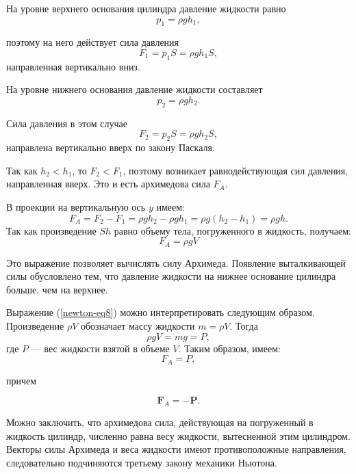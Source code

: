 \documentclass[14pt,a4paper,oneside]{extarticle}	%
\begin{document}
На уровне верхнего основания цилиндра давление жидкости равно $$ p_{1} = \rho gh_{1}, $$

поэтому на него действует сила давления $$ F_{1} = p_{1}S = \rho gh_{1}S, $$
направленная вертикально вниз.

На уровне нижнего основания давление жидкости составляет $$p_{2} = \rho gh_{2}.$$

Сила давления в этом случае $$ F_{2} = p_{2}S = \rho gh_{2}S, $$ 
направлена вертикально вверх по закону Паскаля.

Так как $ h_{2} < h_{1} $, то $ F_{2} < F_{1} $, поэтому возникает равнодействующая сил давления, направленная вверх. 
Это и есть архимедова сила $ F_{A} $. 

В проекции на вертикальную ось $ y $ имеем:
\begin{equation}\label{newton-eq7}
F_{A} = F_{2} - F_{1} = \rho gh_{2} - \rho gh_{1} = \rho g(h_{2} - h_{1}) = \rho gh.
\end{equation} 
Так как произведение $ Sh $ равно объему тела, погруженного в жидкость, получаем: 
\begin{equation}\label{newton-eq8}
F_{A} = \rho gV
\end{equation} 

Это выражение позволяет вычислять силу Архимеда.
Появление выталкивающей силы обусловлено тем, что давление жидкости на нижнее основание цилиндра больше, чем на верхнее.

Выражение (\ref{newton-eq8}) можно интерпретировать следующим образом. 
Произведение $ \rho V $ обозначает массу жидкости  $ m = \rho V $. 
Тогда $$\rho g V = mg = P,$$
где $ P $ — вес жидкости взятой в объеме $ V $. 
Таким образом, имеем:
\begin{equation}\label{newton-eq9}
F_{A} = P,
\end{equation} 

причем 

\begin{equation}\label{newton-eq10}
\textbf{F}_{A} = -\textbf{P}.
\end{equation} 

Можно заключить, что архимедова сила, действующая на погруженный в жидкость цилиндр, численно равна весу жидкости, вытесненной этим цилиндром.
Векторы силы Архимеда и веса жидкости имеют противоположные направления, следовательно подчиняются третьему закону механики Ньютона.
\end{document}
